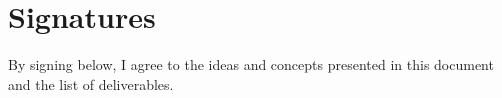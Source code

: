 \documentclass[letterpaper,10pt,serif, draftclsnofoot,onecolumn, compsoc, titlepage]{IEEEtran}
\begin{document}
\newpage
\section{Signatures}
By signing below, I agree to the ideas and concepts presented in this document and the list of deliverables. \\
\vspace{.2in}
\vspace{.2in}
\vspace{.2in}
\end{document}
